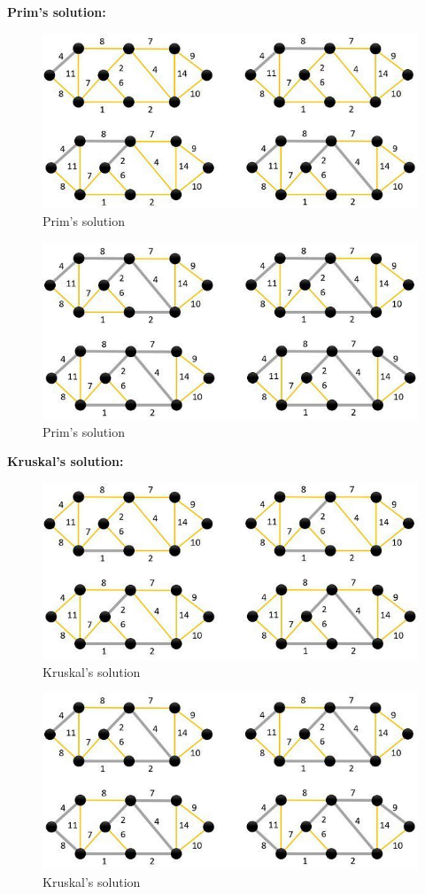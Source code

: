 \documentclass[11pt]{article}
\begin{document}
\begin{enumerate}
          \textbf{Prim's solution:} \\

          \begin{figure}[H]
              \centering
              \includegraphics[width=.45\textwidth]{figures/Solution.jpg}
              \caption{Prim's solution}
          \end{figure}
          \begin{figure}[H]
              \centering
              \includegraphics[width=.45\textwidth]{figures/Solution-part-2.jpg}
              \caption{Prim's solution}
          \end{figure}
          \textbf{Kruskal's solution: }\\

          \begin{figure}[H]
              \centering
              \includegraphics[width=.45\textwidth]{figures/Solution-kruskals.jpg}
              \caption{Kruskal's solution}
          \end{figure}

          \begin{figure}[H]
              \centering
              \includegraphics[width=.45\textwidth]{figures/Solution-kruskals-part-2.jpg}
              \caption{Kruskal's solution}
          \end{figure}


\end{enumerate}
\end{document}
